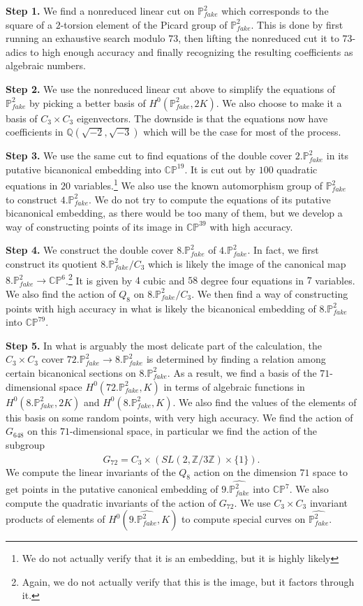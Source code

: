 \documentclass[11pt,reqno]{amsart}
\def\C {{\mathbb C}}
\def\Q {{\mathbb Q}}
\def\Z {{\mathbb Z}}
\def\P {{\mathbb P}}
\def\FPP {{\P^2_{fake}}}
\theoremstyle{definition}
\numberwithin{equation}{section}
\begin{document}
\medskip
{\bf Step 1.} We find a nonreduced linear cut on  $\FPP$  which corresponds to the square of a $2$-torsion element of the Picard group of $\FPP$.
This is done by first running an exhaustive search modulo $73$, then lifting the nonreduced cut it to $73$-adics to high enough accuracy and finally recognizing the resulting coefficients as algebraic numbers.

\medskip
{\bf Step 2.} We use the nonreduced linear cut above to simplify the equations of $\FPP$ by picking a better basis of $H^0(\FPP, 2K)$. We also choose to make it a basis of $C_3\times C_3$ eigenvectors. The downside is that the equations now have coefficients in $\Q(\sqrt{-2},\sqrt{-3})$ which will be the case for most of the process.

\medskip
{\bf Step 3.} We use the same cut to find equations of the double cover $2.\FPP$ in its putative bicanonical embedding into $\C\P^{19}$. It is cut out by $100$ quadratic equations in $20$ variables.\footnote{We do not actually verify that it is an embedding, but it is highly likely}
We also use the known automorphism group of $\FPP$ to construct $4.\FPP$. We do not try to compute the equations of its putative bicanonical embedding, as there would be too many of them, but we develop a way of constructing points of its image in $\C\P^{39}$ with high accuracy. 

\medskip
{\bf Step 4.} We construct the double cover $8.\FPP$ of $4.\FPP$. In fact, we first construct its quotient $8.\FPP/C_3$ which is likely the image of the canonical map $8.\FPP\to \C\P^6$.\footnote{Again, we do not actually verify that this is the image, but it factors through it.} It is given by $4$ cubic and $58$ degree four equations in $7$ variables. We also find the action of $Q_8$ on 
 $8.\FPP/C_3$. We then find a way of constructing points with high accuracy in what is likely the bicanonical embedding of $8.\FPP$ into $\C\P^{79}$.

\medskip
{\bf Step 5.} In what is arguably the most delicate part of the calculation, the $C_3\times C_3$ cover $72.\FPP \to 8.\FPP$ is determined by finding a relation among certain bicanonical sections on  $8.\FPP$.  As a result, we find a basis of the $71$-dimensional space $H^0(72.\FPP,K)$ in terms of algebraic functions in $H^0(8.\FPP,2K)$ and $H^0(8.\FPP,K)$. We also find the values of the elements of this basis  on some random points, with very high accuracy. We find the action of $G_{648}$ on this $71$-dimensional space, in particular we find the action of the subgroup
$$
 \widehat G_{72}=C_3\times  \left( SL(2,\Z/3\Z)  \times \{1\} \right).
$$
We compute the linear invariants of the $Q_8$ action on the dimension $71$ space to get points in the putative canonical embedding of 
$9.\widehat\FPP$ into $\C\P^7$.  We also compute the quadratic invariants of the action of $G_{72}$. We use $C_3\times C_3$ invariant products of elements of $H^0(9.\widehat\FPP,K)$   to compute special curves on $\widehat \FPP$.
\end{document}
